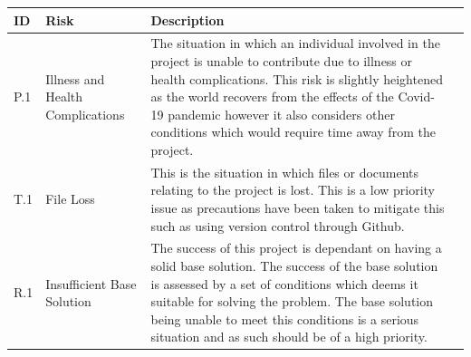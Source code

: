 \documentclass[12pt]{article}  %
\theoremstyle{definition}
\theoremstyle{remark}
\begin{document}
\begin{tabularx}{1.1\textwidth} {
	|  >{\center\arraybackslash}X
	| >{\center\arraybackslash}X
	| >{\center\arraybackslash}X
	| >{\center\arraybackslash} X | }
	\hline
	ID & Risk & Description \\
	\hline
	P.1 & Illness and Health Complications & The situation in which an individual involved in the project is unable to contribute due to illness or health complications. This risk is slightly heightened as the world recovers from the effects of the Covid-19 pandemic however it also considers other conditions which would require time away from the project. \\
	\hline
	T.1 & File Loss & This is the situation in which files or documents relating to the project is lost. This is a low priority issue as precautions have been taken to mitigate this such as using version control through Github. \\
	\hline
	R.1 & Insufficient Base Solution & The success of this project is dependant on having a solid base solution. The success of the base solution is assessed by a set of conditions which deems it suitable for solving the problem. The base solution being unable to meet this conditions is a serious situation and as such should be of a high priority. \\
	\hline
\end{tabularx}
\end{document}
